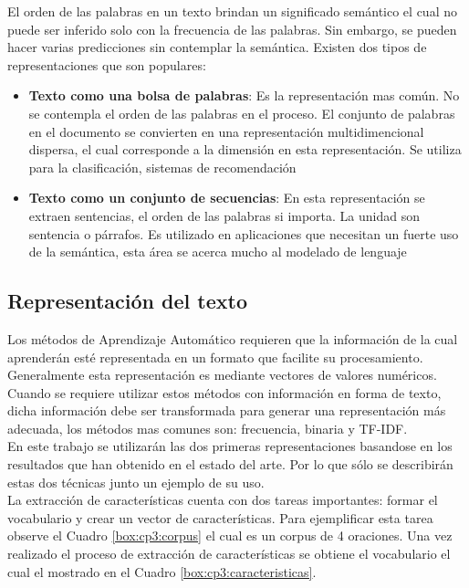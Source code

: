 El orden de las palabras en un texto brindan un significado semántico el cual no puede ser inferido  solo con la frecuencia de las palabras. Sin embargo, se pueden hacer varias predicciones sin contemplar la semántica. Existen dos tipos de representaciones que son populares:

\begin{itemize}
	\item \textbf{Texto como una bolsa de palabras}: Es la representación mas común. No se contempla el orden de las palabras en el proceso. El conjunto de palabras en el documento se convierten en una representación multidimencional dispersa, el cual corresponde a la dimensión en esta representación. Se utiliza para la clasificación, sistemas de recomendación

	\item \textbf{Texto como un conjunto de secuencias}: En esta representación se extraen sentencias, el orden de las palabras si importa. La unidad son sentencia o párrafos. Es utilizado en aplicaciones que necesitan un fuerte uso de la semántica, esta área se acerca mucho al modelado de lenguaje
\end{itemize}


\subsection{Representación del texto}

Los métodos de Aprendizaje Automático requieren que la información de la cual aprenderán esté representada en un
formato que facilite su procesamiento. Generalmente esta representación es mediante vectores de valores numéricos. 
Cuando se requiere utilizar estos métodos con información en forma de texto, dicha
información debe ser transformada para generar una representación más adecuada, los métodos mas comunes son: frecuencia, binaria y TF-IDF.\\ 


En este trabajo se utilizarán las dos primeras representaciones basandose en los resultados que han obtenido en el estado del arte. Por lo que sólo se describirán estas dos técnicas junto un ejemplo de su uso.\\


La extracción de características cuenta con dos tareas importantes: formar el vocabulario y crear un vector de características. Para ejemplificar esta tarea observe el Cuadro \ref{box:cp3:corpus} el cual es un corpus de 4 oraciones. Una vez realizado el proceso de extracción de características se obtiene el vocabulario el cual el mostrado en el Cuadro \ref{box:cp3:caracteristicas}.\\\\

